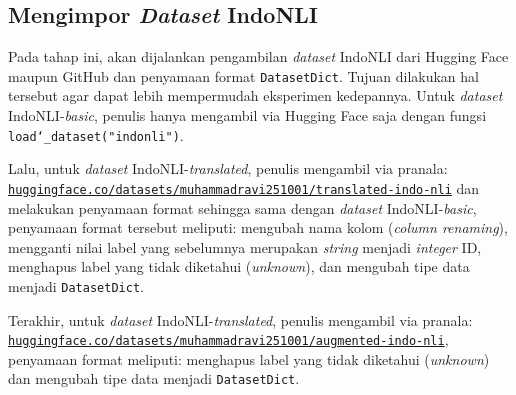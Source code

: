 \subsection{Mengimpor \emph{Dataset} IndoNLI}
Pada tahap ini, akan dijalankan pengambilan \emph{dataset} IndoNLI dari Hugging Face maupun GitHub dan penyamaan format \texttt{DatasetDict}. Tujuan dilakukan hal tersebut agar dapat lebih mempermudah eksperimen kedepannya. Untuk \emph{dataset} IndoNLI-\emph{basic}, penulis hanya mengambil via Hugging Face saja dengan fungsi \texttt{load\char`_dataset("indonli")}. 

Lalu, untuk \emph{dataset} IndoNLI-\emph{translated}, penulis mengambil via pranala: \href{https://huggingface.co/datasets/muhammadravi251001/translated-indo-nli}{\texttt{huggingface.co/datasets/muhammadravi251001/translated-indo-nli}} dan melakukan penyamaan format sehingga sama dengan \emph{dataset} IndoNLI-\emph{basic}, penyamaan format tersebut meliputi: mengubah nama kolom (\emph{column renaming}), mengganti nilai label yang sebelumnya merupakan \emph{string} menjadi \emph{integer} ID, menghapus label yang tidak diketahui (\emph{unknown}), dan mengubah tipe data menjadi \texttt{DatasetDict}. 

Terakhir, untuk \emph{dataset} IndoNLI-\emph{translated}, penulis mengambil via pranala: \href{https://huggingface.co/datasets/muhammadravi251001/augmented-indo-nli}{\texttt{huggingface.co/datasets/muhammadravi251001/augmented-indo-nli}}, penyamaan format meliputi: menghapus label yang tidak diketahui (\emph{unknown}) dan mengubah tipe data menjadi \texttt{DatasetDict}.

